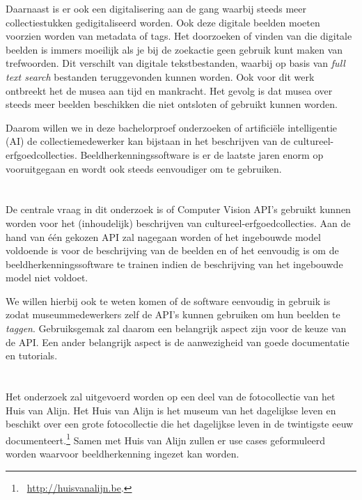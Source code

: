 Daarnaast is er ook een digitalisering aan de gang waarbij steeds meer collectiestukken gedigitaliseerd worden. Ook deze digitale beelden moeten voorzien worden van metadata of tags. Het doorzoeken of vinden van die digitale beelden is immers moeilijk als je bij de zoekactie geen gebruik kunt maken van trefwoorden. Dit verschilt van digitale tekstbestanden, waarbij op basis van \textit{full text search} bestanden teruggevonden kunnen worden. Ook voor dit werk ontbreekt het de musea aan tijd en mankracht. Het gevolg is dat musea over steeds meer beelden beschikken die niet ontsloten of gebruikt kunnen worden. 

Daarom willen we in deze bachelorproef onderzoeken of artificiële intelligentie (AI) de collectiemedewerker kan bijstaan in het beschrijven van de cultureel-erfgoedcollecties. Beeldherkenningssoftware is er de laatste jaren enorm op vooruitgegaan en wordt ook steeds eenvoudiger om te gebruiken.

\section{}
\label{sec:onderzoeksvraag}

De centrale vraag in dit onderzoek is of Computer Vision API’s gebruikt kunnen worden voor het (inhoudelijk) beschrijven van cultureel-erfgoedcollecties. Aan de hand van één gekozen API zal nagegaan worden of het ingebouwde model voldoende is voor de beschrijving van de beelden en of het eenvoudig is om de beeldherkenningssoftware te trainen indien de beschrijving van het ingebouwde model niet voldoet. 

We willen hierbij ook te weten komen of de software eenvoudig in gebruik is zodat museummedewerkers zelf de API’s kunnen gebruiken om hun beelden te \textit{taggen}. Gebruiksgemak zal daarom een belangrijk aspect zijn voor de keuze van de API. Een ander belangrijk aspect is de aanwezigheid van goede documentatie en tutorials.

\section{}
\label{sec:onderzoeksdoelstelling}

Het onderzoek zal uitgevoerd worden op een deel van de fotocollectie van het Huis van Alijn. Het Huis van Alijn is het museum van het dagelijkse leven en beschikt over een grote fotocollectie die het dagelijkse leven in de twintigste eeuw documenteert.\footnote{~\url{http://huisvanalijn.be}.} Samen met Huis van Alijn zullen er use cases geformuleerd worden waarvoor beeldherkenning ingezet kan worden.

